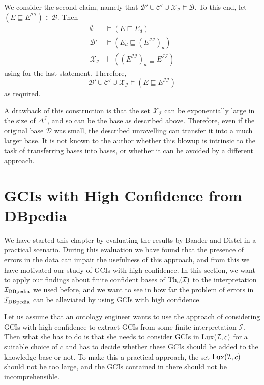 \begin{Proof}
  We consider the second claim, namely that $\mathcal{B}' \cup \mathcal{C}' \cup
  \mathcal{X}_{\mathcal{I}} \models \mathcal{B}$.  To this end, let $(E \sqsubseteq
  E^{\mathcal{I}\mathcal{I}}) \in \mathcal{B}$.  Then
  \begin{align*}
    \emptyset &\models (E \sqsubseteq E_{d})\\
    \mathcal{B}' &\models (E_{d} \sqsubseteq (E^{\mathcal{I}\mathcal{I}})_{d})\\
    \mathcal{X}_{\mathcal{I}} &\models ((E^{\mathcal{I}\mathcal{I}})_{d}
    \sqsubseteq E^{\mathcal{I}\mathcal{I}})
  \end{align*}
  using  for the last statement.  Therefore,
  \begin{equation*}
    \mathcal{B}' \cup \mathcal{C}' \cup \mathcal{X}_{\mathcal{I}} \models (E \sqsubseteq
    E^{\mathcal{I}\mathcal{I}})
  \end{equation*}
  as required.
\end{Proof}

A drawback of this construction is that the set $\mathcal{X}_{\mathcal{I}}$ can be
exponentially large in the size of $\Delta^{\mathcal{I}}$, and so can be the \ELbot base
as described above.  Therefore, even if the original base $\mathcal{D}$ was small, the
described unravelling can transfer it into a much larger base.  It is not known to the
author whether this blowup is intrinsic to the task of transferring \ELgfpbot bases into
\ELbot bases, or whether it can be avoided by a different approach.

\section{GCIs with High Confidence from DBpedia}
\label{sec:exper-with-conf}

We have started this chapter by evaluating the results by Baader and Distel in a practical
scenario.  During this evaluation we have found that the presence of errors in the data
can impair the usefulness of this approach, and from this we have motivated our study of
GCIs with high confidence.  In this section, we want to apply our findings about finite
confident bases of $\operatorname{Th}_c(\mathcal{I})$ to the interpretation ${\mathcal{I}_{\text{DBpedia}}}$ we used before,
and we want to see in how far the problem of errors in ${\mathcal{I}_{\text{DBpedia}}}$ can be alleviated by
using GCIs with high confidence.

Let us assume that an ontology engineer wants to use the approach of considering GCIs with
high confidence to extract GCIs from some finite interpretation $\mathcal{I}$.  Then what
she has to do is that she needs to consider GCIs in $\operatorname{Lux}(\mathcal{I}, c)$ for a suitable
choice of $c$ and has to decide whether these GCIs should be added to the knowledge base
or not.  To make this a practical approach, the set $\operatorname{Lux}(\mathcal{I}, c)$ should not be
too large, and the GCIs contained in there should not be incomprehensible.

